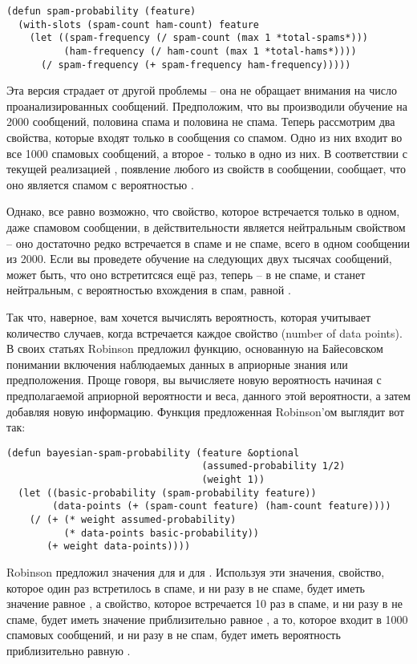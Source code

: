 \begin{lstlisting}
(defun spam-probability (feature)
  (with-slots (spam-count ham-count) feature
    (let ((spam-frequency (/ spam-count (max 1 *total-spams*)))
          (ham-frequency (/ ham-count (max 1 *total-hams*))))
      (/ spam-frequency (+ spam-frequency ham-frequency)))))
\end{lstlisting}

Эта версия страдает от другой проблемы -- она не обращает внимания на число
проанализированных сообщений.  Предположим, что вы производили обучение на 2000 сообщений,
половина спама и половина не спама.  Теперь рассмотрим два свойства, которые входят только
в сообщения со спамом.  Одно из них входит во все 1000 спамовых сообщений, а второе -
только в одно из них.  В соответствии с текущей реализацией ,
появление любого из свойств в сообщении, сообщает, что оно является спамом с вероятностью
.

Однако, все равно возможно, что свойство, которое встречается только в одном, даже
спамовом сообщении, в действительности является нейтральным свойством -- оно достаточно
редко встречается в спаме и не спаме, всего в одном сообщении из 2000.  Если вы проведете
обучение на следующих двух тысячах сообщений, может быть, что оно встретитсяся ещё раз,
теперь -- в не спаме, и станет нейтральным, с вероятностью вхождения в спам, равной
.

Так что, наверное, вам хочется вычислять вероятность, которая учитывает количество
случаев, когда встречается каждое свойство (number of data points).  В своих статьях
Robinson предложил функцию, основанную на Байесовском понимании включения наблюдаемых
данных в априорные знания или предположения. Проще говоря, вы вычисляете новую вероятность
начиная с предполагаемой априорной вероятности и веса, данного этой вероятности, а затем
добавляя новую информацию. Функция предложенная Robinson'ом выглядит вот так:

\begin{lstlisting}
(defun bayesian-spam-probability (feature &optional
                                  (assumed-probability 1/2)
                                  (weight 1))
  (let ((basic-probability (spam-probability feature))
        (data-points (+ (spam-count feature) (ham-count feature))))
    (/ (+ (* weight assumed-probability)
          (* data-points basic-probability))
       (+ weight data-points))))
\end{lstlisting}

Robinson предложил значения  для  и  для
.  Используя эти значения, свойство, которое один раз встретилось в спаме, и
ни разу в не спаме, будет иметь значение  равное
, а свойство, которое встречается 10 раз в спаме, и ни разу в не спаме, будет
иметь значение  приблизительно равное , а то,
которое входит в 1000 спамовых сообщений, и ни разу в не спам, будет иметь вероятность
приблизительно равную .

